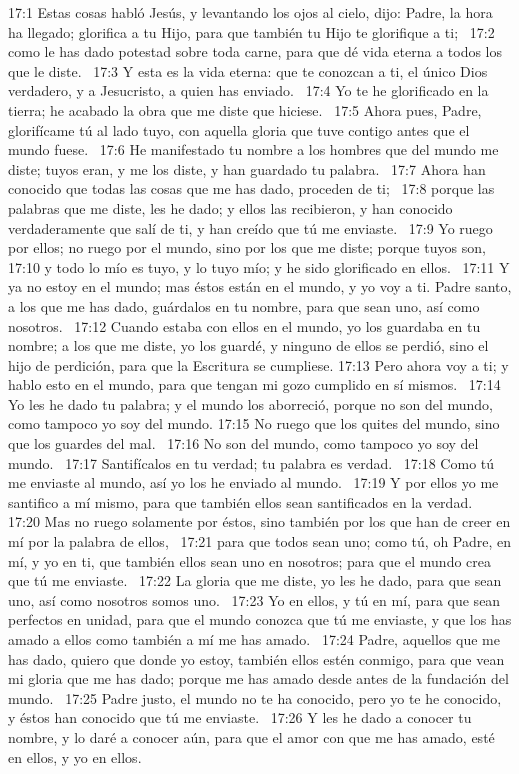 17:1 Estas cosas habló Jesús, y levantando los ojos al cielo, dijo: Padre, la hora ha llegado; glorifica a tu Hijo, para que también tu Hijo te glorifique a ti;  
17:2 como le has dado potestad sobre toda carne, para que dé vida eterna a todos los que le diste.  
17:3 Y esta es la vida eterna: que te conozcan a ti, el único Dios verdadero, y a Jesucristo, a quien has enviado.  
17:4 Yo te he glorificado en la tierra; he acabado la obra que me diste que hiciese.  
17:5 Ahora pues, Padre, glorifícame tú al lado tuyo, con aquella gloria que tuve contigo antes que el mundo fuese.  
17:6 He manifestado tu nombre a los hombres que del mundo me diste; tuyos eran, y me los diste, y han guardado tu palabra.  
17:7 Ahora han conocido que todas las cosas que me has dado, proceden de ti;  
17:8 porque las palabras que me diste, les he dado; y ellos las recibieron, y han conocido verdaderamente que salí de ti, y han creído que tú me enviaste.  
17:9 Yo ruego por ellos; no ruego por el mundo, sino por los que me diste; porque tuyos son,  
17:10 y todo lo mío es tuyo, y lo tuyo mío; y he sido glorificado en ellos.  
17:11 Y ya no estoy en el mundo; mas éstos están en el mundo, y yo voy a ti. Padre santo, a los que me has dado, guárdalos en tu nombre, para que sean uno, así como nosotros.  
17:12 Cuando estaba con ellos en el mundo, yo los guardaba en tu nombre; a los que me diste, yo los guardé, y ninguno de ellos se perdió, sino el hijo de perdición, para que la Escritura se cumpliese. 
17:13 Pero ahora voy a ti; y hablo esto en el mundo, para que tengan mi gozo cumplido en sí mismos.  
17:14 Yo les he dado tu palabra; y el mundo los aborreció, porque no son del mundo, como tampoco yo soy del mundo. 
17:15 No ruego que los quites del mundo, sino que los guardes del mal.  
17:16 No son del mundo, como tampoco yo soy del mundo.  
17:17 Santifícalos en tu verdad; tu palabra es verdad.  
17:18 Como tú me enviaste al mundo, así yo los he enviado al mundo.  
17:19 Y por ellos yo me santifico a mí mismo, para que también ellos sean santificados en la verdad.  
17:20 Mas no ruego solamente por éstos, sino también por los que han de creer en mí por la palabra de ellos,  
17:21 para que todos sean uno; como tú, oh Padre, en mí, y yo en ti, que también ellos sean uno en nosotros; para que el mundo crea que tú me enviaste.  
17:22 La gloria que me diste, yo les he dado, para que sean uno, así como nosotros somos uno.  
17:23 Yo en ellos, y tú en mí, para que sean perfectos en unidad, para que el mundo conozca que tú me enviaste, y que los has amado a ellos como también a mí me has amado.  
17:24 Padre, aquellos que me has dado, quiero que donde yo estoy, también ellos estén conmigo, para que vean mi gloria que me has dado; porque me has amado desde antes de la fundación del mundo.  
17:25 Padre justo, el mundo no te ha conocido, pero yo te he conocido, y éstos han conocido que tú me enviaste.  
17:26 Y les he dado a conocer tu nombre, y lo daré a conocer aún, para que el amor con que me has amado, esté en ellos, y yo en ellos.  
